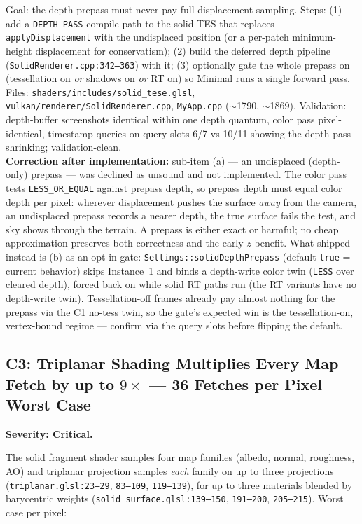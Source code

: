 \documentclass[11pt,a4paper]{article}
\begin{document}
\begin{tcolorbox}[promptbox={Prompt --- C2: displacement-free (conservative) depth prepass}]
Goal: the depth prepass must never pay full displacement sampling. Steps:
(1) add a \texttt{DEPTH\_PASS} compile path to the solid TES that replaces
\texttt{applyDisplacement} with the undisplaced position (or a per-patch
minimum-height displacement for conservatism); (2) build the deferred depth
pipeline (\texttt{SolidRenderer.cpp:342--363}) with it; (3) optionally gate the
whole prepass on (tessellation on \emph{or} shadows on \emph{or} RT on) so
Minimal runs a single forward pass. Files:
\texttt{shaders/includes/solid\_tese.glsl},
\texttt{vulkan/renderer/SolidRenderer.cpp}, \texttt{MyApp.cpp} ($\sim$1790,
$\sim$1869). Validation: depth-buffer screenshots identical within one depth
quantum, color pass pixel-identical, timestamp queries on query slots 6/7 vs
10/11 showing the depth pass shrinking; validation-clean.
\\ \textbf{Correction after implementation:} sub-item (a) --- an undisplaced
(depth-only) prepass --- was declined as unsound and not implemented. The
color pass tests \texttt{LESS\_OR\_EQUAL} against prepass depth, so prepass
depth must equal color depth per pixel: wherever displacement pushes the
surface \emph{away} from the camera, an undisplaced prepass records a nearer
depth, the true surface fails the test, and sky shows through the terrain. A
prepass is either exact or harmful; no cheap approximation preserves both
correctness and the early-$z$ benefit. What shipped instead is (b) as an
opt-in gate: \texttt{Settings::solidDepthPrepass} (default \texttt{true} =
current behavior) skips Instance~1 and binds a depth-write color twin
(\texttt{LESS} over cleared depth), forced back on while solid RT paths run
(the RT variants have no depth-write twin). Tessellation-off frames already
pay almost nothing for the prepass via the C1 no-tess twin, so the gate's
expected win is the tessellation-on, vertex-bound regime --- confirm via the
query slots before flipping the default.
\end{tcolorbox}

\subsection{C3: Triplanar Shading Multiplies Every Map Fetch by up to $9\times$ --- 36 Fetches per Pixel Worst Case}
\label{sec:c3}

\textbf{Severity: Critical.}

The solid fragment shader samples four map families (albedo, normal,
roughness, AO) and triplanar projection samples \emph{each} family on up to
three projections (\texttt{triplanar.glsl:23--29},
\texttt{83--109}, \texttt{119--139}), for up to three materials blended by
barycentric weights (\texttt{solid\_surface.glsl:139--150},
\texttt{191--200}, \texttt{205--215}). Worst case per pixel:
\end{document}
